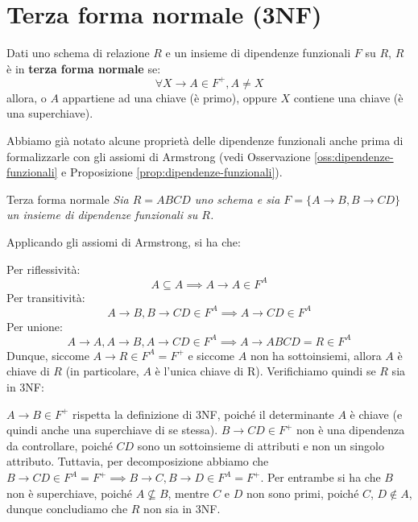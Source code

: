 \chapter{Terza forma normale (3NF)}

\begin{redbar}
    Dati uno schema di relazione $R$ e un insieme di dipendenze funzionali $F$ su $R$, $R$ è in \textbf{terza forma normale} se:
    \begin{equation*}
        \forall X\to A\in F^+, A\neq X
    \end{equation*}
    allora, o $A$ appartiene ad una chiave (è primo), oppure $X$ contiene una chiave (è una superchiave).
\end{redbar}

Abbiamo già notato alcune proprietà delle dipendenze funzionali anche prima di formalizzarle con gli assiomi di Armstrong (vedi Osservazione \ref{oss:dipendenze-funzionali} e Proposizione \ref{prop:dipendenze-funzionali}).

\begin{Example}{Terza forma normale}{}
    \textit{Sia $R = ABCD$ uno schema e sia $F = \{A \to B, B \to CD\}$ un insieme di dipendenze funzionali su $R$. }
    
    Applicando gli assiomi di Armstrong, si ha che:
    
    Per riflessività:
    \begin{equation*}
        A \subseteq A \implies A \to A \in F^A
    \end{equation*}
    Per transitività:
    \begin{equation*}
        A \to B, B \to CD \in F^A \implies A \to CD \in F^A
    \end{equation*}
    Per unione:
    \begin{equation*}
        A \to A, A \to B, A \to CD \in F^A \implies A \to ABCD = R \in F^A
    \end{equation*}
    Dunque, siccome $A \to R \in F^A = F^+$ e siccome $A$ non ha sottoinsiemi, allora $A$ è chiave di $R$ (in particolare, $A$ è l'unica chiave di R). Verifichiamo quindi se $R$ sia in 3NF:
   
    $A \to B \in F^+$ rispetta la definizione di 3NF, poiché il determinante $A$ è chiave (e quindi anche una superchiave di se stessa). $B \to CD \in F^+$ non è una dipendenza da controllare, poiché $CD$ sono un sottoinsieme di attributi e non un singolo attributo. Tuttavia, per decomposizione abbiamo che $B \to CD \in F^A = F^+ \implies B \to C, B \to D \in F^A = F^+$. Per entrambe si ha che $B$ non è superchiave, poiché $A \not\subseteq B$, mentre $C$ e $D$ non sono primi, poiché $C$, $D \notin A$, dunque concludiamo che $R$ non sia in 3NF.
\end{Example}

